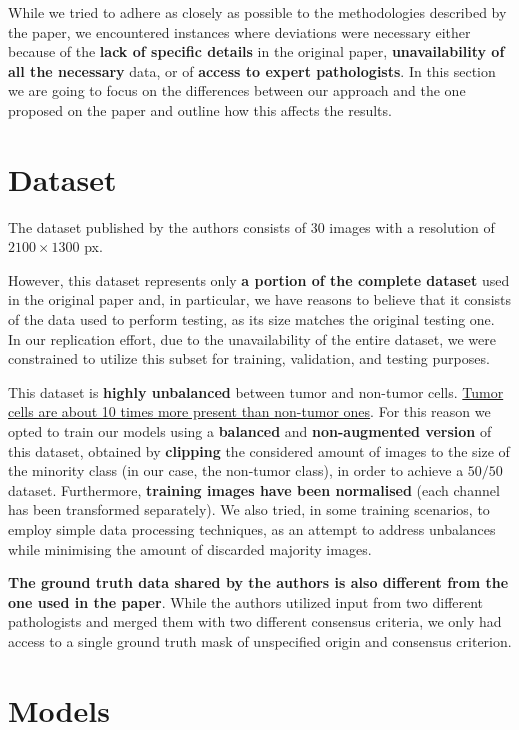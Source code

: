 \par
While we tried to adhere as closely as possible to the methodologies described by the paper, we encountered instances where deviations were necessary either because of the \textbf{lack of specific details} in the original paper, \textbf{unavailability of all the necessary} data, or of \textbf{access to expert pathologists}. In this section we are going to focus on the differences between our approach and the one proposed on the paper and outline how this affects the results.
\section{Dataset}
\par
The dataset published by the authors consists of 30 images with a resolution of $2100\times1300$ px. 
\par
However, this dataset represents only \textbf{a portion of the complete dataset} used in the original paper and, in particular, we have reasons to believe that it consists of the data used to perform testing, as its size matches the original testing one. In our replication effort, due to the unavailability of the entire dataset, we were constrained to utilize this subset for training, validation, and testing purposes.
\par
This dataset is \textbf{highly unbalanced} between tumor and non-tumor cells. \uline{Tumor cells are about 10 times more present than non-tumor ones}. For this reason we opted to train our models using a \textbf{balanced} and \textbf{non-augmented version} of this dataset, obtained by \textbf{clipping} the considered amount of images to the size of the minority class (in our case, the non-tumor class), in order to achieve a $50/50$ dataset.
Furthermore, \textbf{training images have been normalised} (each channel has been transformed separately).
We also tried, in some training scenarios, to employ simple data processing techniques, as an attempt to address unbalances while minimising the amount of discarded majority images.

\par
\textbf{The ground truth data shared by the authors is also different from the one used in the paper}. While the authors utilized input from two different pathologists and merged them with two different consensus criteria, we only had access to a single ground truth mask of unspecified origin and consensus criterion.

\section{Models}

